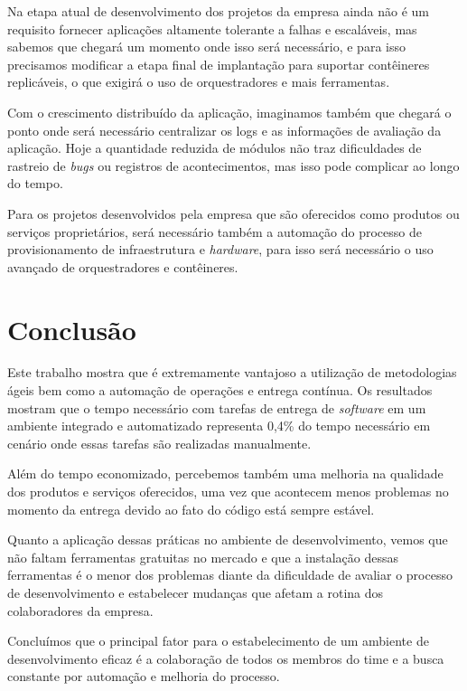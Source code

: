 \documentclass[
	12pt,				%
	openright,			%
	oneside,			%
	a4paper,			%
	english,			%
	french,				%
	spanish,			%
	brazil,				%
	]{abntex2}
\begin{document}
Na etapa atual de desenvolvimento dos projetos da empresa ainda não é um requisito fornecer aplicações altamente tolerante a falhas e escaláveis, mas sabemos que chegará um momento onde isso será necessário, e para isso precisamos modificar a etapa final de implantação para suportar contêineres replicáveis, o que exigirá o uso de orquestradores e mais ferramentas.

Com o crescimento distribuído da aplicação, imaginamos também que chegará o ponto onde será necessário centralizar os logs e as informações de avaliação da aplicação. Hoje a quantidade reduzida de módulos não traz dificuldades de rastreio de \textit{bugs} ou registros de acontecimentos, mas isso pode complicar ao longo do tempo.

Para os projetos desenvolvidos pela empresa que são oferecidos como produtos ou serviços proprietários, será necessário também a automação do processo de provisionamento de infraestrutura e \textit{hardware}, para isso será necessário o uso avançado de orquestradores e contêineres.


\chapter{Conclusão}

Este trabalho mostra que é extremamente vantajoso a utilização de metodologias ágeis bem como a automação de operações e entrega contínua. Os resultados mostram que o tempo necessário com tarefas de entrega de \textit{software} em um ambiente integrado e automatizado representa 0,4\% do tempo necessário em cenário onde essas tarefas são realizadas manualmente.

Além do tempo economizado, percebemos também uma melhoria na qualidade dos produtos e serviços oferecidos, uma vez que acontecem menos problemas no momento da entrega devido ao fato do código está sempre estável.

Quanto a aplicação dessas práticas no ambiente de desenvolvimento, vemos que não faltam ferramentas gratuitas no mercado e que a instalação dessas ferramentas é o menor dos problemas diante da dificuldade de avaliar o processo de desenvolvimento e estabelecer mudanças que afetam a rotina dos colaboradores da empresa.

Concluímos que o principal fator para o estabelecimento de um ambiente de desenvolvimento eficaz é a colaboração de todos os membros do time e a busca constante por automação e melhoria do processo.
\end{document}
